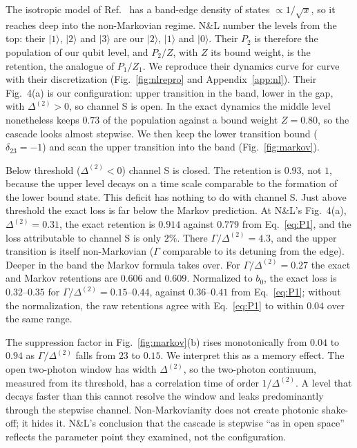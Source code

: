 \documentclass[aps,prresearch,twocolumn,superscriptaddress,nofootinbib,longbibliography,floatfix]{revtex4-2}
\begin{document}
The isotropic model of Ref.~\cite{NikolopoulosLambropoulos2000} has a band-edge density of states $\propto1/\sqrt x$, so
it reaches deep into the non-Markovian regime. N\&L number the levels from the top: their $|1\rangle$, $|2\rangle$ and
$|3\rangle$ are our $|2\rangle$, $|1\rangle$ and $|0\rangle$. Their $P_2$ is therefore the population of our qubit
level, and $P_2/Z$, with $Z$ its bound weight, is the retention, the analogue of $P_1/Z_1$. We reproduce their dynamics curve for curve with their discretization
(Fig.~\ref{fig:nlrepro} and Appendix~\ref{app:nl}). Their Fig.~4(a) is our configuration: upper transition in the band,
lower in the gap, with $\Delta^{(2)}>0$, so channel S is open. In the exact dynamics the middle level nonetheless keeps
$0.73$ of the population against a bound weight $Z=0.80$, so the cascade looks almost stepwise. We then keep the
lower transition bound ($\delta_{23}=-1$) and scan the upper transition into the band (Fig.~\ref{fig:markov}).

Below threshold ($\Delta^{(2)}<0$) channel S is closed. The retention is $0.93$, not $1$, because the upper level
decays on a time scale comparable to the formation of the lower bound state. This deficit has nothing to do with
channel S.
Just above threshold the exact loss is far below the Markov prediction. At N\&L's Fig.~4(a), $\Delta^{(2)}=0.31$,
the exact retention is $0.914$ against $0.779$ from Eq.~\eqref{eq:P1}, and the loss attributable to channel S is only
$2\%$. There $\Gamma/\Delta^{(2)}=4.3$, and the upper transition is itself non-Markovian ($\Gamma$ comparable to its
detuning from the edge).
Deeper in the band the Markov formula takes over. For $\Gamma/\Delta^{(2)}=0.27$ the exact and Markov retentions
are $0.606$ and $0.609$. Normalized to $b_0$, the exact loss is $0.32$--$0.35$ for $\Gamma/\Delta^{(2)}=0.15$--$0.44$,
against $0.36$--$0.41$ from Eq.~\eqref{eq:P1}; without the normalization, the raw retentions agree with
Eq.~\eqref{eq:P1} to within $0.04$ over the same range.

The suppression factor in Fig.~\ref{fig:markov}(b) rises monotonically from $0.04$ to $0.94$ as $\Gamma/\Delta^{(2)}$
falls from $23$ to $0.15$. We interpret this as a memory effect. The open two-photon window has width $\Delta^{(2)}$, so
the two-photon continuum, measured from its threshold, has a correlation time of order $1/\Delta^{(2)}$. A level that
decays faster than this cannot resolve the window and leaks predominantly through the stepwise channel. Non-Markovianity
does not create photonic shake-off; it hides it. N\&L's conclusion that the cascade is stepwise ``as in open space''
reflects the parameter point they examined, not the configuration.
\end{document}
